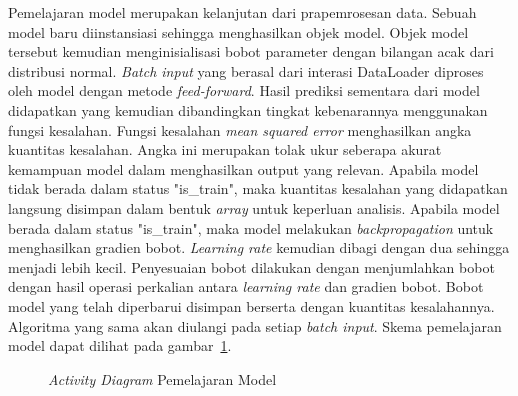 Pemelajaran model merupakan kelanjutan dari prapemrosesan data. Sebuah model baru diinstansiasi
sehingga menghasilkan objek model. Objek model tersebut kemudian menginisialisasi bobot parameter
dengan bilangan acak dari distribusi normal. \textit{Batch input} yang berasal dari interasi DataLoader
diproses oleh model dengan metode \textit{feed-forward}. Hasil prediksi sementara dari model
didapatkan yang kemudian dibandingkan tingkat kebenarannya menggunakan fungsi kesalahan.
Fungsi kesalahan \textit{mean squared error} menghasilkan angka kuantitas kesalahan. Angka ini merupakan
tolak ukur seberapa akurat kemampuan model dalam menghasilkan output yang relevan. Apabila model tidak
berada dalam status "is\_train", maka kuantitas kesalahan yang didapatkan langsung disimpan dalam bentuk
\textit{array} untuk keperluan analisis. Apabila model berada dalam status "is\_train", maka model
melakukan \textit{backpropagation} untuk menghasilkan gradien bobot. \textit{Learning rate} kemudian
dibagi dengan dua sehingga menjadi lebih kecil. Penyesuaian bobot dilakukan dengan menjumlahkan bobot
dengan hasil operasi perkalian antara \textit{learning rate} dan gradien bobot. Bobot model yang telah
diperbarui disimpan berserta dengan kuantitas kesalahannya. Algoritma yang sama akan diulangi pada setiap \textit{batch input}.
Skema pemelajaran model dapat dilihat pada gambar~\ref{fig:learning}.

\begin{figure}[htbp]
    \begin{center}
    \end{center}
    \vspace{-20pt}
    \captionsetup{labelfont=bf, textfont=bf}
    \caption{\textit{Activity Diagram} Pemelajaran Model}
    \vspace{-10pt}
    \captionsetup{labelfont=md, textfont=md}
    \label{fig:learning}
\end{figure}

